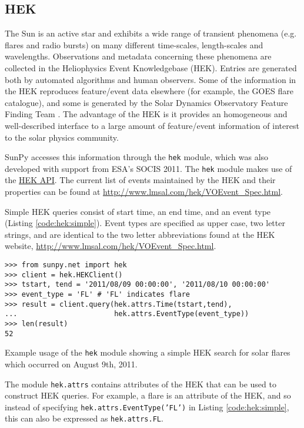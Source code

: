 \subsection{HEK}\label{ssec:hek}

The Sun is an active star and exhibits a wide range of transient phenomena 
(e.g. flares and radio bursts) on many different time-scales, length-scales and 
wavelengths. Observations and metadata concerning these phenomena are collected 
in the Heliophysics Event Knowledgebase (HEK).  Entries are generated both by 
automated algorithms and human observers.  Some of the information in the HEK 
reproduces feature/event data elsewhere (for example, the GOES flare catalogue),
and some is generated by the Solar Dynamics Observatory Feature Finding Team 
\citep{martens2012}.  The advantage of the HEK is it 
provides an homogeneous and well-described interface to a large amount of 
feature/event information of interest to the solar physics community.


SunPy accesses this information through the \texttt{hek} module, which was also
developed with support from ESA's SOCIS 2011.  The \texttt{hek} module makes 
use of the 
\href{http://vso.stanford.edu/hekwiki/ApplicationProgrammingInterface?action=print}{HEK
 API}.
The current list of events maintained by the HEK and their properties can be 
found at \url{http://www.lmsal.com/hek/VOEvent_Spec.html}.

Simple HEK queries consist of start time, an end time, and an event type 
(Listing \ref{code:hek:simple}). Event types are specified as upper case, 
two letter strings, and are 
identical to the two letter abbreviations found at the HEK website, 
\url{http://www.lmsal.com/hek/VOEvent_Spec.html}.

\begin{listing}[H]
\begin{verbatim}
>>> from sunpy.net import hek
>>> client = hek.HEKClient()
>>> tstart, tend = '2011/08/09 00:00:00', '2011/08/10 00:00:00'
>>> event_type = 'FL' # 'FL' indicates flare
>>> result = client.query(hek.attrs.Time(tstart,tend), 
...                       hek.attrs.EventType(event_type))
>>> len(result)
52
\end{verbatim}
\caption{Example usage of the \texttt{hek} module showing a simple HEK search for solar flares
which occurred on August 9th, 2011.}
\label{code:hek:simple}
\end{listing}

The module \texttt{hek.attrs} contains attributes of the HEK that can be used to
construct HEK queries.  For example, a flare is an attribute of the HEK, and so 
instead of specifying \texttt{hek.attrs.EventType('FL')} in Listing 
\ref{code:hek:simple}, this can also be expressed as \texttt{hek.attrs.FL}. 

